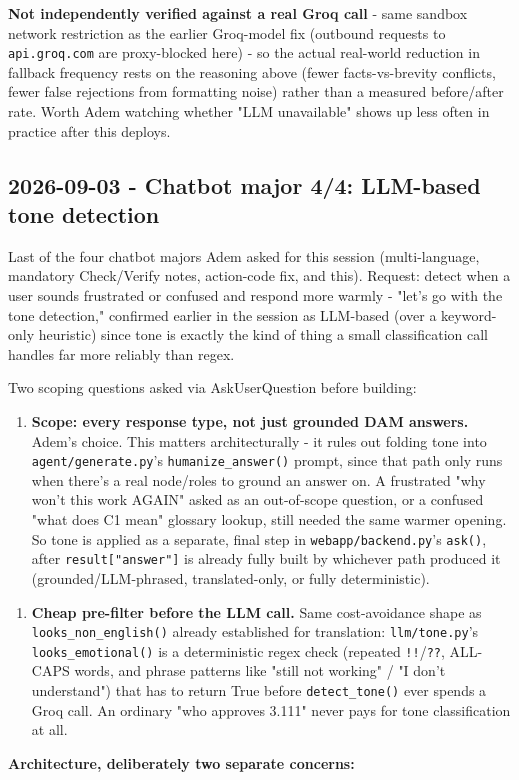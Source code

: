 \textbf{Not independently verified against a real Groq call} - same sandbox network restriction as the earlier Groq-model fix (outbound requests to \texttt{api.groq.com} are proxy-blocked here) - so the actual real-world reduction in fallback frequency rests on the reasoning above (fewer facts-vs-brevity conflicts, fewer false rejections from formatting noise) rather than a measured before/after rate. Worth Adem watching whether "LLM unavailable" shows up less often in practice after this deploys.

\subsection*{2026-09-03 - Chatbot major 4/4: LLM-based tone detection}
Last of the four chatbot majors Adem asked for this session (multi-language, mandatory Check/Verify notes, action-code fix, and this). Request: detect when a user sounds frustrated or confused and respond more warmly - "let's go with the tone detection," confirmed earlier in the session as LLM-based (over a keyword-only heuristic) since tone is exactly the kind of thing a small classification call handles far more reliably than regex.

Two scoping questions asked via AskUserQuestion before building:

\begin{enumerate}
\item \textbf{Scope: every response type, not just grounded DAM answers.} Adem's choice. This matters architecturally - it rules out folding tone into \texttt{agent/\allowbreak{}generate.py}'s \texttt{humanize\_\allowbreak{}answer()} prompt, since that path only runs when there's a real node/roles to ground an answer on. A frustrated "why won't this work AGAIN" asked as an out-of-scope question, or a confused "what does C1 mean" glossary lookup, still needed the same warmer opening. So tone is applied as a separate, final step in \texttt{webapp/\allowbreak{}backend.py}'s \texttt{ask()}, after \texttt{result["answer"]} is already fully built by whichever path produced it (grounded/LLM-phrased, translated-only, or fully deterministic).
\end{enumerate}
\begin{enumerate}
\item \textbf{Cheap pre-filter before the LLM call.} Same cost-avoidance shape as \texttt{looks\_\allowbreak{}non\_\allowbreak{}english()} already established for translation: \texttt{llm/\allowbreak{}tone.py}'s \texttt{looks\_\allowbreak{}emotional()} is a deterministic regex check (repeated \texttt{!!}/\texttt{??}, ALL-CAPS words, and phrase patterns like "still not working" / "I don't understand") that has to return True before \texttt{detect\_\allowbreak{}tone()} ever spends a Groq call. An ordinary "who approves 3.111" never pays for tone classification at all.
\end{enumerate}
\textbf{Architecture, deliberately two separate concerns:}

